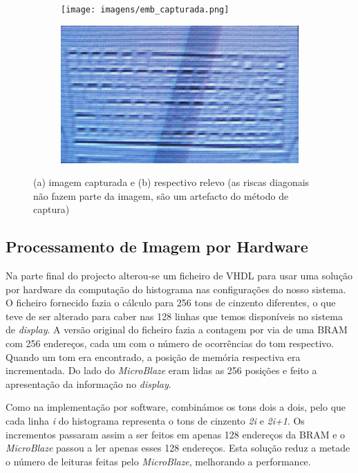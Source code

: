 \documentclass[a4paper,12pt]{article}
\begin{document}
\begin{figure}[h]
	\centering
	\begin{subfigure}[b]{0.40\textwidth}
		\centering
		\texttt{[image: imagens/emb\_capturada.png]}
		\caption{}
	\end{subfigure}
	\begin{subfigure}[b]{0.40\textwidth}
		\centering
		\includegraphics[width=\linewidth]{imagens/emb_resultado.png}
		\caption{}
	\end{subfigure}
	\caption{(a) imagem capturada e (b) respectivo relevo (as riscas diagonais não fazem parte da imagem, são um artefacto do método de captura)}
	\label{fig:relevo}
\end{figure}
\FloatBarrier

\subsection{Processamento de Imagem por Hardware}
Na parte final do projecto alterou-se um ficheiro de VHDL para usar uma solução por hardware da computação do histograma nas configurações do nosso sistema. O ficheiro fornecido fazia o cálculo para 256 tons de cinzento diferentes, o que teve de ser alterado para caber nas 128 linhas que temos disponíveis no sistema de \textit{display}. A versão original do ficheiro fazia a contagem por via de uma BRAM com 256 endereços, cada um com o número de ocorrências do tom respectivo. Quando um tom era encontrado, a posição de memória respectiva era incrementada. Do lado do \textit{MicroBlaze} eram lidas as 256 posições e feito a apresentação da informação no \textit{display}. 

Como na implementação por software, combinámos os tons dois a dois, pelo que cada linha \textit{i} do histograma representa o tons de cinzento \textit{2i} e \textit{2i+1}. Os incrementos passaram assim a ser feitos em apenas 128 endereços da BRAM e o \textit{MicroBlaze} passou a ler apenas esses 128 endereços. Esta solução reduz a metade o número de leituras feitas pelo \textit{MicroBlaze}, melhorando a performance.
\end{document}
